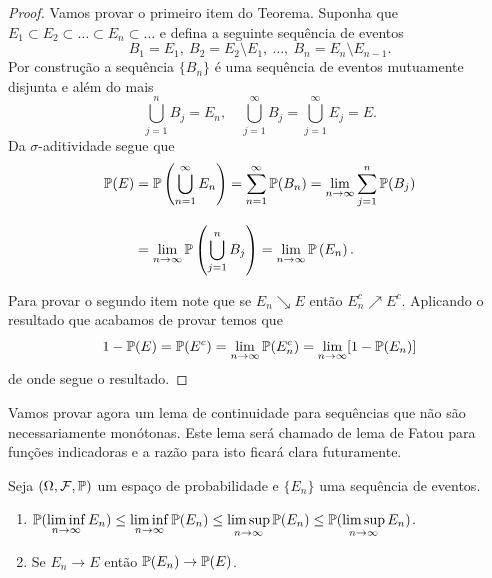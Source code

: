 \begin{proof}
Vamos provar o primeiro item do Teorema. 
Suponha que $E_1\subset E_2\subset \ldots\subset E_n\subset \ldots$
e defina a seguinte sequência de eventos 
\[
B_1= E_1,\ B_2= E_2\setminus E_1,\ \ldots,\  B_n=E_n\setminus E_{n-1}.
\]
Por construção a sequência $\{B_n\}$ é uma sequência de eventos
mutuamente disjunta e além do mais 
\[
\bigcup_{j=1}^n B_j = E_n, \quad 
\bigcup_{j=1}^{\infty} B_j = \bigcup_{j=1}^{\infty} E_j = E.
\]
Da $\sigma$-aditividade segue que 
\begin{align*}
	\P(E)
	&=
		\P\left( \bigcup_{n=1}^{\infty} E_n\right)
		=
		\sum_{n=1}^{\infty}\P(B_n)
		=
		\lim_{n\to\infty} \sum_{j=1}^n \P(B_j)
	\\[0.3cm]
	&=
		\lim_{n\to\infty}\P\left( \bigcup_{j=1}^{n} B_j\right)
		=
		\lim_{n\to\infty}\P\left( E_n\right).
\end{align*}

Para provar o segundo item note que se $E_n\searrow E$ 
então $E_n^c \nearrow E^c$. Aplicando o resultado que 
acabamos de provar temos que 
	\[
		1-\P(E)
		=
		\P(E^c)		
		=
		\lim_{n\to\infty} \P(E_n^c)
		=
		\lim_{n\to\infty} [1-\P(E_n)]		
	\]
de onde segue o resultado.
\end{proof}

Vamos provar agora um lema de continuidade para sequências 
que não são necessariamente monótonas. 
Este lema será chamado de lema de Fatou para funções indicadoras
e a razão para isto ficará clara futuramente.

\begin{lema}
Seja $(\Omega,\F,\P)$ um espaço de probabilidade e 
$\{E_n\}$ uma sequência de eventos.
\begin{enumerate}
	\item
	$\displaystyle
	\P(\liminf_{n\to\infty} E_n)
	\leq 
	\liminf_{n\to\infty} \P(E_n)
	\leq
	\limsup_{n\to\infty} \P(E_n)
	\leq
	\P(\limsup_{n\to\infty} E_n)$.
	
	\item Se $E_n\to E$ então $\P(E_n)\to \P(E)$.
\end{enumerate}
\end{lema}


